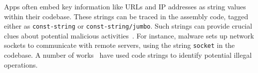 
Apps often embed key information like URLs and IP addresses as string values within their codebase.
These strings can be traced in the assembly code, tagged either as \texttt{const-string} or \texttt{const-string/jumbo}. 
Such strings can provide crucial clues about potential malicious activities~\cite{arp2014drebin}.
For instance, malware sets up network sockets to communicate with remote servers, using the string \texttt{socket} in the codebase.
A number of works~\cite{arp2014drebin,kim2018multimodal,zhu2019transparent} have used code strings to identify potential illegal operations.




